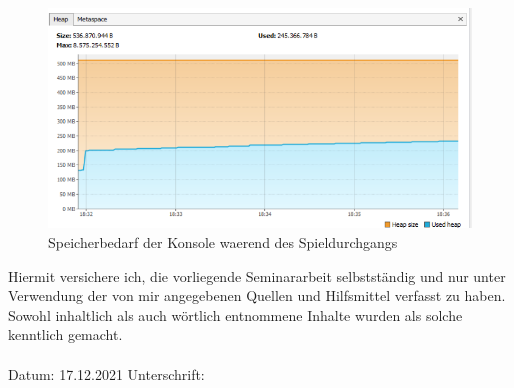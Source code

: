 \documentclass[a4paper,12pt]{scrreprt}
\begin{document}
\begin{figure}
  \centering
  \includegraphics{Memory_console_execute.png}
  \caption{Speicherbedarf der Konsole waerend des Spieldurchgangs}
  \label{fig:Console_mem_Execute}
\end{figure}

\newpage

\label{erklaerung}

Hiermit versichere ich, die vorliegende Seminararbeit selbstständig und nur unter Verwendung der von mir angegebenen Quellen und Hilfsmittel verfasst zu haben. Sowohl inhaltlich als auch wörtlich entnommene Inhalte wurden als solche kenntlich gemacht. \\
\\[1.5cm]
Datum:	17.12.2021 \hrulefill\enspace Unterschrift: \hrulefill
\\[3.5cm]
\end{document}
